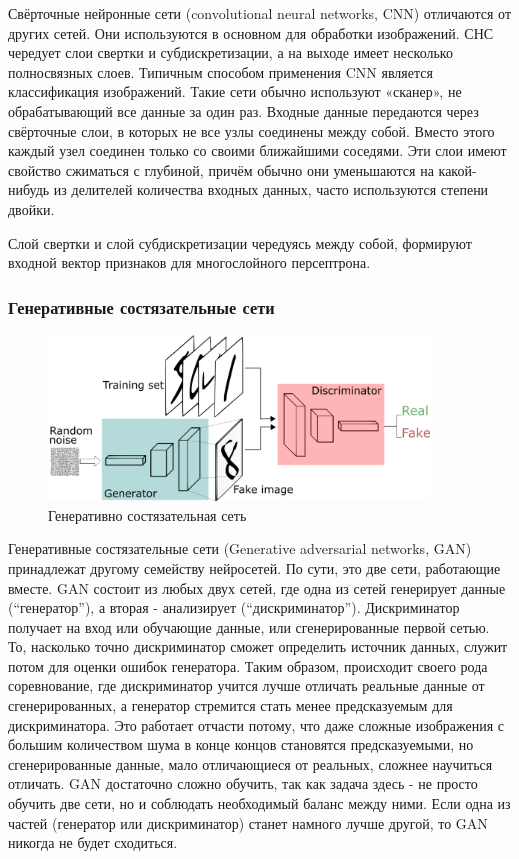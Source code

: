 Свёрточные нейронные сети (convolutional neural networks, CNN)  отличаются от других сетей. Они используются в основном для обработки изображений. СНС чередует слои свертки и субдискретизации, а на выходе имеет несколько полносвязных слоев. Типичным способом применения CNN является классификация изображений. Такие сети обычно используют «сканер», не обрабатывающий все данные за один раз. Входные данные передаются через свёрточные слои, в которых не все узлы соединены между собой. Вместо этого каждый узел соединен только со своими ближайшими соседями. Эти слои имеют свойство сжиматься с глубиной, причём обычно они уменьшаются на какой-нибудь из делителей количества входных данных, часто используются степени двойки. 

Слой свертки и слой субдискретизации чередуясь между собой, формируют входной вектор признаков для многослойного персептрона.

\subsubsection{Генеративные состязательные сети}

\begin{figure}[htbp]
\centering
\caption{Генеративно состязательная сеть}
\includegraphics[width=0.9\textwidth]{fig/GANs.png}
\end{figure}

Генеративные состязательные сети (Generative adversarial networks, GAN) принадлежат другому семейству нейросетей. По сути, это две сети, работающие вместе. GAN состоит из любых двух сетей, где одна из сетей генерирует данные (“генератор”), а вторая - анализирует (“дискриминатор”). Дискриминатор получает на вход или обучающие данные, или сгенерированные первой сетью. То, насколько точно дискриминатор сможет определить источник данных, служит потом для оценки ошибок генератора. Таким образом, происходит своего рода соревнование, где дискриминатор учится лучше отличать реальные данные от сгенерированных, а генератор стремится стать менее предсказуемым для дискриминатора. Это работает отчасти потому, что даже сложные изображения с большим количеством шума в конце концов становятся предсказуемыми, но сгенерированные данные, мало отличающиеся от реальных, сложнее научиться отличать. GAN достаточно сложно обучить, так как задача здесь - не просто обучить две сети, но и соблюдать необходимый баланс между ними. Если одна из частей (генератор или дискриминатор) станет намного лучше другой, то GAN никогда не будет сходиться.


